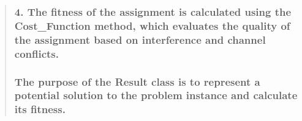 \documentclass[11pt]{article}
\begin{document}
\begin{quote}
\hypertarget{the-fitness-of-the-assignment-is-calculated-using-the-cost_function-method-which-evaluates-the-quality-of-the-assignment-based-on-interference-and-channel-conflicts.}{%
\subsubsection{\texorpdfstring{ 4. The fitness of the assignment is
calculated using the Cost\_Function method, which evaluates the quality
of the assignment based on interference and channel
conflicts.}{  4. The fitness of the assignment is calculated using the Cost\_Function method, which evaluates the quality of the assignment based on interference and channel conflicts.}}\label{the-fitness-of-the-assignment-is-calculated-using-the-cost_function-method-which-evaluates-the-quality-of-the-assignment-based-on-interference-and-channel-conflicts.}}

\hypertarget{the-purpose-of-the-result-class-is-to-represent-a-potential-solution-to-the-problem-instance-and-calculate-its-fitness.}{%
\subsubsection{\texorpdfstring{ The purpose of the Result class is to
represent a potential solution to the problem instance and calculate its
fitness.}{  The purpose of the Result class is to represent a potential solution to the problem instance and calculate its fitness.}}\label{the-purpose-of-the-result-class-is-to-represent-a-potential-solution-to-the-problem-instance-and-calculate-its-fitness.}}
\end{quote}
\end{document}
